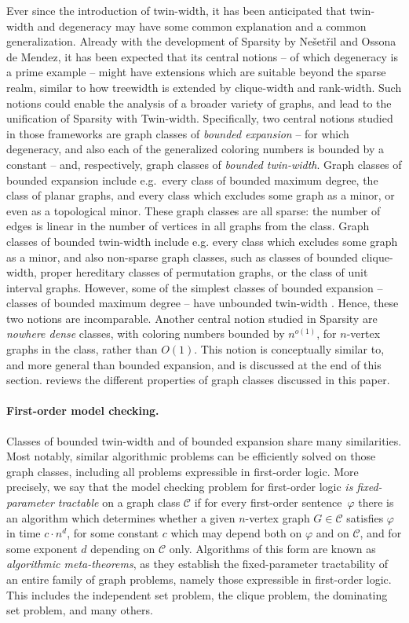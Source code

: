 \documentclass[11pt]{article}
\theoremstyle{remark}
\def\Nesetril{Ne\v{s}et\v{r}il\xspace}
\def\phi{\varphi}
\def\cal{\mathcal}
\newcommand{\CC}{\cal C}
\begin{document}
\smallskip
Ever since the introduction of twin-width, it has been anticipated that twin-width and degeneracy may have some common explanation and a common generalization.
Already with the development
of Sparsity by \Nesetril and Ossona de Mendez,
it has been expected
that its central notions -- of which degeneracy is a prime example -- might have extensions which are suitable beyond the sparse realm, similar to how treewidth is extended by clique-width and rank-width.
Such notions could enable the
analysis of a broader variety of graphs,
and lead to the
unification of Sparsity with Twin-width.
Specifically, two central notions studied in those frameworks are
graph classes of \emph{bounded expansion} -- for which degeneracy, and also each of the generalized coloring numbers is bounded by a constant  --
 and, respectively, graph classes of \emph{bounded twin-width}.
Graph classes of bounded expansion include e.g.\
every  class of bounded maximum degree,
the class of planar graphs,
and every class which excludes some graph as a minor, or even as a topological minor. These graph classes are all sparse: the number of edges is linear in the number of vertices in all graphs from the class.
Graph classes of bounded twin-width
include e.g. every class which excludes some graph as a minor, and also non-sparse graph classes, such as classes of bounded clique-width, proper hereditary classes of permutation graphs, or the class of unit interval graphs. However, some of the simplest classes of bounded expansion -- classes
of bounded maximum degree -- have unbounded twin-width \cite{tww2}. Hence, these two notions are incomparable.
Another central notion studied in Sparsity are \emph{nowhere dense} classes, with coloring numbers bounded by $n^{o(1)}$, for $n$-vertex graphs in the class, rather than $O(1)$. This notion is conceptually similar to, and more general than bounded expansion, and is
discussed at the end of this section.
 reviews the different properties of graph classes discussed in this paper.



\paragraph{First-order model checking.}
Classes of bounded twin-width and of bounded expansion share many similarities.
Most notably, similar algorithmic
problems can be efficiently solved on those graph classes, including all problems expressible
in first-order logic.
More precisely, we say that the model checking problem for first-order logic \emph{is fixed-parameter tractable} on a graph class $\CC$ if for every first-order sentence~$\phi$
there is an algorithm which determines whether a given $n$-vertex graph $G\in\CC$ satisfies $\phi$
in time
$c\cdot n^d$, for some constant $c$ which may depend both on $\phi$ and on $\CC$,
and for some exponent $d$ depending on $\CC$ only. Algorithms of this form are known as \emph{algorithmic meta-theorems}, as they establish the fixed-parameter tractability of an entire family of graph problems,  namely those expressible in first-order logic.
This includes the independent set problem, the clique problem, the dominating set problem, and many others.
\end{document}
